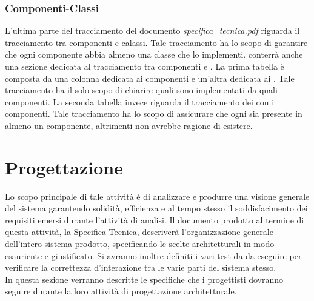 {\subsubsection{Componenti-Classi}
L'ultima parte del tracciamento del documento \textit{specifica\_tecnica.pdf} riguarda il tracciamento tra componenti e calassi. Tale tracciamento ha lo scopo di garantire che ogni componente abbia almeno una classe che lo implementi. conterrà anche una sezione dedicata al tracciamento tra componenti e . La prima tabella è composta da una colonna dedicata ai componenti e un'altra dedicata ai . Tale tracciamento ha il solo scopo di chiarire quali  sono implementati da quali componenti.
La seconda tabella invece riguarda il tracciamento dei  con i componenti. Tale tracciamento ha lo scopo di assicurare che ogni  sia presente in almeno un componente, altrimenti non avrebbe ragione di esistere.


\section{Progettazione}\label{sec:progettazione}
Lo scopo principale di tale attività è di analizzare e produrre una visione generale del sistema garantendo solidità, efficienza e al tempo stesso il soddisfacimento dei requisiti emersi durante l'attività di analisi.
Il documento prodotto al termine di questa attività, la Specifica Tecnica, descriverà l'organizzazione generale dell'intero sistema prodotto, specificando le scelte architetturali in modo esauriente e giustificato. Si avranno inoltre definiti i vari test da da eseguire per verificare la correttezza d'interazione tra le varie parti del sistema stesso.\\

In questa sezione verranno descritte le specifiche che i progettisti dovranno seguire durante la loro attività di progettazione architetturale.

}
